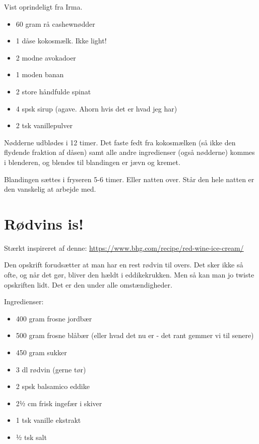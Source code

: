 \documentclass[
]{book}
\providecommand{\tightlist}{%
  \setlength{\itemsep}{0pt}\setlength{\parskip}{0pt}}
\begin{document}
Vist oprindeligt fra Irma.

\begin{itemize}
\tightlist
\item
  60 gram rå cashewnødder
\item
  1 dåse kokosmælk. Ikke light!
\item
  2 modne avokadoer
\item
  1 moden banan
\item
  2 store håndfulde spinat
\item
  4 spsk sirup (agave. Ahorn hvis det er hvad jeg har)
\item
  2 tsk vanillepulver
\end{itemize}

Nødderne udblødes i 12 timer. Det faste fedt fra kokosmælken (så ikke den flydende fraktion af dåsen) samt alle andre ingredienser (også nødderne) kommes i blenderen, og blendes til blandingen er jævn og kremet.

Blandingen sættes i fryseren 5-6 timer. Eller natten over. Står den hele natten er den vanskelig at arbejde med.

\hypertarget{ruxf8dvins-is}{%
\section{Rødvins is!}\label{ruxf8dvins-is}}

Stærkt inspireret af denne: \url{https://www.bhg.com/recipe/red-wine-ice-cream/}

Den opskrift forudsætter at man har en rest rødvin til overs. Det sker ikke så ofte, og når det gør, bliver den hældt i eddikekrukken. Men så kan man jo twiste opskriften lidt. Det er den under alle omstændigheder.

Ingredienser:

\begin{itemize}
\tightlist
\item
  400 gram frosne jordbær
\item
  500 gram frosne blåbær (eller hvad det nu er - det rant gemmer vi til senere)
\item
  450 gram sukker
\item
  3 dl rødvin (gerne tør)
\item
  2 spsk balsamico eddike
\item
  2½ cm frisk ingefær i skiver
\item
  1 tsk vanille ekstrakt
\item
  ½ tsk salt
\end{itemize}
\end{document}
